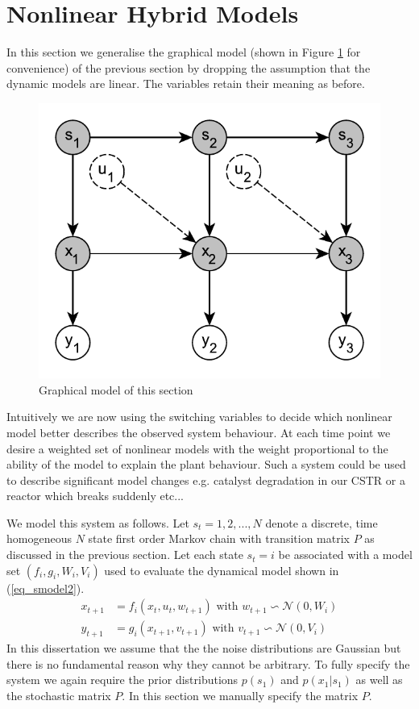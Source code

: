 \documentclass[../masters.tex]{subfiles}
\begin{document}
\graphicspath{{./imgs/}{../imgs/}} %

\section{Nonlinear Hybrid Models}
In this section we generalise the graphical model (shown in Figure \ref{fig_hybridmod2} for convenience) of the previous section by dropping the assumption that the dynamic models are linear. The variables retain their meaning as before.     
\begin{figure}[H] 
\centering
\includegraphics[scale=1.0]{hybrid_model.pdf}
\caption{Graphical model of this section}
\label{fig_hybridmod2}
\end{figure}
Intuitively we are now using the switching variables to decide which nonlinear model better describes the observed system behaviour. At each time point we desire a weighted set of nonlinear models with the weight proportional to the ability of the model to explain the plant behaviour. Such a system could be used to describe significant model changes e.g. catalyst degradation in our CSTR or a reactor which breaks suddenly etc... 

We model this system as follows. Let $s_t=1,2,..., N$ denote a discrete, time homogeneous $N$ state first order Markov chain with transition matrix $P$ as discussed in the previous section. Let each state $s_t=i$ be associated with a model set $\left(f_i, g_i, W_i, V_i \right)$ used to evaluate the dynamical model shown in (\ref{eq_smodel2}).
\begin{equation}
\begin{aligned}
x_{t+1} &= f_i(x_t, u_t, w_{t+1}) \text{ with } w_{t+1} \backsim \mathcal{N}(0, W_i)\\
y_{t+1} &= g_i(x_{t+1}, v_{t+1}) \text{ with } v_{t+1} \backsim \mathcal{N}(0,V_i)
\end{aligned}
\label{eq_smodel2}
\end{equation}
In this dissertation we assume that the the noise distributions are Gaussian but there is no fundamental reason why they cannot be arbitrary. To fully specify the system we again require the prior distributions $p(s_1)$ and $p(x_1|s_1)$ as well as the stochastic matrix $P$. In this section we manually specify the matrix $P$. 
\end{document}
